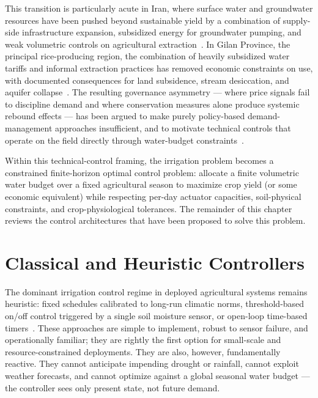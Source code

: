 This transition is particularly acute in Iran, where surface water and
groundwater resources have been pushed beyond sustainable yield by a
combination of supply-side infrastructure expansion, subsidized energy
for groundwater pumping, and weak volumetric controls on agricultural
extraction~\cite{Mesgaran2018,Nouri2023,Behling2022}. In Gilan
Province, the principal rice-producing region, the combination of
heavily subsidized water tariffs and informal extraction practices has
removed economic constraints on use, with documented consequences for
land subsidence, stream desiccation, and aquifer
collapse~\cite{Mesgaran2018,PourgholamAmiji2024}. The resulting
governance asymmetry --- where price signals fail to discipline
demand and where conservation measures alone produce systemic rebound
effects --- has been argued to make purely policy-based
demand-management approaches insufficient, and to motivate technical
controls that operate on the field directly through water-budget
constraints~\cite{PerezBlanco2020,Hajirad2025,Hesabi2023}.

Within this technical-control framing, the irrigation problem becomes a
constrained finite-horizon optimal control problem: allocate a finite
volumetric water budget over a fixed agricultural season to maximize
crop yield (or some economic equivalent) while respecting per-day
actuator capacities, soil-physical constraints, and crop-physiological
tolerances. The remainder of this chapter reviews the control
architectures that have been proposed to solve this problem.

\section{Classical and Heuristic Controllers}
\label{sec:lit-classical}

The dominant irrigation control regime in deployed agricultural systems
remains heuristic: fixed schedules calibrated to long-run climatic
norms, threshold-based on/off control triggered by a single soil
moisture sensor, or open-loop time-based timers~\cite{Sharma2025,Bayar2025}.
These approaches are simple to implement, robust to sensor failure,
and operationally familiar; they are rightly the first option for
small-scale and resource-constrained deployments. They are also,
however, fundamentally reactive. They cannot anticipate impending
drought or rainfall, cannot exploit weather forecasts, and cannot
optimize against a global seasonal water budget --- the controller
sees only present state, not future demand.

